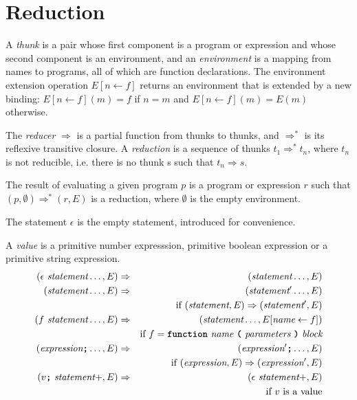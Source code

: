 \section*{Reduction}

A \emph{thunk} is a pair whose first component is a program or expression
and whose
second component is an environment, and an 
\emph{environment} is a mapping from names to programs, all of which are
function declarations. The environment extension operation
$E [ n \leftarrow f]$ returns an environment that is extended by
a new binding: $E[n \leftarrow f](m) = f$ if $n = m$ and
$E[n \leftarrow f](m) = E(m)$ otherwise.

The \emph{reducer} $\Rightarrow$ is a partial function from thunks to thunks,
and $\Rightarrow^*$ is its reflexive transitive closure.
A \emph{reduction} is a sequence of thunks
$t_1 \Rightarrow^* t_n$, where $t_n$ is not reducible, i.e. there is no thunk
s such that $t_n \Rightarrow s$.

The result of evaluating a given program $p$ is a program or expression $r$
such that $(p, \emptyset) \Rightarrow^* (r, E)$ is a reduction,
where $\emptyset$ is the empty environment.

The statement $\epsilon$ is the empty statement, introduced for convenience.

A \emph{value} is a primitive number expresssion, primitive boolean expression
or a primitive string expression.
\begin{eqnarray*}
(\epsilon  \ \textit{statement} \ldots, E)
  & \Rightarrow &
  (\textit{statement} \ldots, E) \\
(\textit{statement} \ldots, E)
  & \Rightarrow &
  (\textit{statement}' \ldots, E)\\
                                       && \textrm{if}\
                                          (\textit{statement},E) \Rightarrow
                                          (\textit{statement}',E) \\
( f\ \textit{statement} \ldots, E)
  & \Rightarrow &
  ( \textit{statement} \ldots, E[\textit{name} \leftarrow f]) \\
                                       && \textrm{if}\
                                 f = \textbf{\texttt{function}}\  \textit{name} \ 
                                 \textbf{\texttt{(}}\  \textit{parameters}
                                 \ \textbf{\texttt{)}}\ \textit{block}    \\
(\textit{expression} \textbf{\texttt{;}} \ldots, E)
  & \Rightarrow &
  ( \textit{expression}'\textbf{\texttt{;}} \ldots, E) \\
                                       && \textrm{if}\
                                 (\textit{expression}, E) \Rightarrow
                                 (\textit{expression}', E)  \\
(v \textbf{\texttt{;}}\ \textit{statement}+, E)
  & \Rightarrow &
  ( \epsilon\ \textit{statement}+, E) \\
                                       && \textrm{if}\
                                 v \ \mbox{is a value}
\end{eqnarray*}


